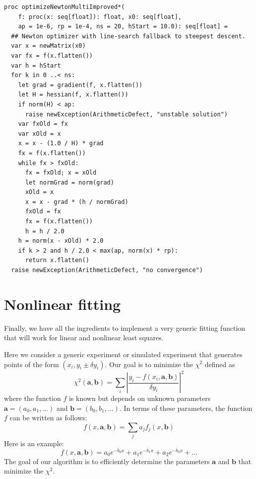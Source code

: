 \documentclass[justified, sixbynine]{tufte-book}
\def\ft{\small\tt}
\theoremstyle{plain}%
\newtheorem * {corollary}{Corollary}
\theoremstyle{definition}
\theoremstyle{remark}
\newtheorem * {remark}{Remark}
\newtheorem * {note}{Note}
\begin{document}
\begin{fullwidth}
\begin{lstlisting}[caption={in file: {\ft nlib/solvers.nim}}]
proc optimizeNewtonMultiImproved*(
    f: proc(x: seq[float]): float, x0: seq[float],
    ap = 1e-6, rp = 1e-4, ns = 20, hStart = 10.0): seq[float] =
  ## Newton optimizer with line-search fallback to steepest descent.
  var x = newMatrix(x0)
  var fx = f(x.flatten())
  var h = hStart
  for k in 0 ..< ns:
    let grad = gradient(f, x.flatten())
    let H = hessian(f, x.flatten())
    if norm(H) < ap:
      raise newException(ArithmeticDefect, "unstable solution")
    var fxOld = fx
    var xOld = x
    x = x - (1.0 / H) * grad
    fx = f(x.flatten())
    while fx > fxOld:
      fx = fxOld; x = xOld
      let normGrad = norm(grad)
      xOld = x
      x = x - grad * (h / normGrad)
      fxOld = fx
      fx = f(x.flatten())
      h = h / 2.0
    h = norm(x - xOld) * 2.0
    if k > 2 and h / 2.0 < max(ap, norm(x) * rp):
      return x.flatten()
  raise newException(ArithmeticDefect, "no convergence")
\end{lstlisting}

\goodbreak\section{Nonlinear fitting}

Finally, we have all the ingredients to implement a very generic fitting function that will work for linear and nonlinear least squares.

Here we consider a generic experiment or simulated experiment that generates points of the form $(x_i, y_i \pm \delta y_i)$. Our goal is to minimize the $\chi^2$ defined as
\begin{equation}
\chi^2(\mathbf{a}, \mathbf{b}) = \sum _i \left|
\frac{y_i - f(x_i, \mathbf{a}, \mathbf{b})}{\delta y_i}
\right|^2
\end{equation}
where the function $f$ is known but depends on unknown parameters $\mathbf{a}=(a_0, a_1, ...)$ and $\mathbf{b}=(b_0, b_1, ...)$. In terms of these parameters, the function $f$ can be written as follows:
\begin{equation}
f(x, \mathbf{a}, \mathbf{b}) = \sum_j a_j f_j(x, \mathbf{b})
\end{equation}
Here is an example:
\begin{equation}
f(x, \mathbf{a}, \mathbf{b}) = a_0 e^{-b_0 x} + a_1 e^{-b_1 x} + a_2 e^{-b_2 x} + ...
\end{equation}
The goal of our algorithm is to efficiently determine the parameters $\mathbf{a}$ and $\mathbf{b}$ that minimize the $\chi^2$.


\end{fullwidth}
\end{document}
